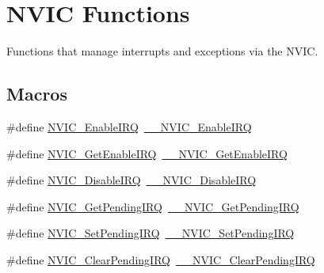 \hypertarget{group___c_m_s_i_s___core___n_v_i_c_functions}{}\section{N\+V\+IC Functions}
\label{group___c_m_s_i_s___core___n_v_i_c_functions}


Functions that manage interrupts and exceptions via the N\+V\+IC.  


\subsection*{Macros}
\begin{DoxyCompactItemize}
\item 
\#define \mbox{\hyperlink{group___c_m_s_i_s___core___n_v_i_c_functions_ga57b3064413dbc7459d9646020fdd8bef}{N\+V\+I\+C\+\_\+\+Enable\+I\+RQ}}~\mbox{\hyperlink{group___c_m_s_i_s___core___n_v_i_c_functions_ga71227e1376cde11eda03fcb62f1b33ea}{\+\_\+\+\_\+\+N\+V\+I\+C\+\_\+\+Enable\+I\+RQ}}
\item 
\#define \mbox{\hyperlink{group___c_m_s_i_s___core___n_v_i_c_functions_ga857de13232ec65dd15087eaa15bc4a69}{N\+V\+I\+C\+\_\+\+Get\+Enable\+I\+RQ}}~\mbox{\hyperlink{group___c_m_s_i_s___core___n_v_i_c_functions_gaaeb5e7cc0eaad4e2817272e7bf742083}{\+\_\+\+\_\+\+N\+V\+I\+C\+\_\+\+Get\+Enable\+I\+RQ}}
\item 
\#define \mbox{\hyperlink{group___c_m_s_i_s___core___n_v_i_c_functions_ga73b4e251f59cab4e9a5e234aac02ae57}{N\+V\+I\+C\+\_\+\+Disable\+I\+RQ}}~\mbox{\hyperlink{group___c_m_s_i_s___core___n_v_i_c_functions_gae016e4c1986312044ee768806537d52f}{\+\_\+\+\_\+\+N\+V\+I\+C\+\_\+\+Disable\+I\+RQ}}
\item 
\#define \mbox{\hyperlink{group___c_m_s_i_s___core___n_v_i_c_functions_gac608957a239466e9e0cbc30aa64feb3b}{N\+V\+I\+C\+\_\+\+Get\+Pending\+I\+RQ}}~\mbox{\hyperlink{group___c_m_s_i_s___core___n_v_i_c_functions_ga5a92ca5fa801ad7adb92be7257ab9694}{\+\_\+\+\_\+\+N\+V\+I\+C\+\_\+\+Get\+Pending\+I\+RQ}}
\item 
\#define \mbox{\hyperlink{group___c_m_s_i_s___core___n_v_i_c_functions_ga2b47e2e52cf5c48a5c3348636434b3ac}{N\+V\+I\+C\+\_\+\+Set\+Pending\+I\+RQ}}~\mbox{\hyperlink{group___c_m_s_i_s___core___n_v_i_c_functions_gaabefdd4b790b9a7308929938c0c1e1ad}{\+\_\+\+\_\+\+N\+V\+I\+C\+\_\+\+Set\+Pending\+I\+RQ}}
\item 
\#define \mbox{\hyperlink{group___c_m_s_i_s___core___n_v_i_c_functions_ga590cf113000a079b1f0ea3dcd5b5316c}{N\+V\+I\+C\+\_\+\+Clear\+Pending\+I\+RQ}}~\mbox{\hyperlink{group___c_m_s_i_s___core___n_v_i_c_functions_ga562a86dbdf14827d0fee8fdafb04d191}{\+\_\+\+\_\+\+N\+V\+I\+C\+\_\+\+Clear\+Pending\+I\+RQ}}

\end{DoxyCompactItemize}
